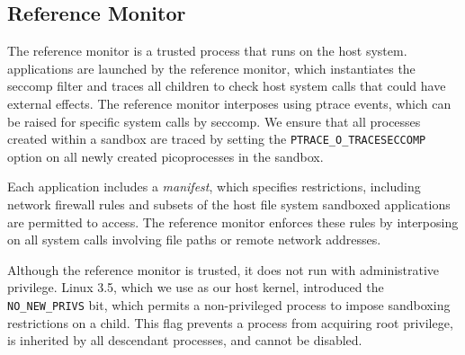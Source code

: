 \subsection{Reference Monitor}
\label{sec:graphene:security:monitor}

The reference monitor is a trusted process that runs on the host system.
\sysname{} applications are launched by the reference monitor,
which instantiates the seccomp filter and traces all children
to check host system calls that could have external effects.
The reference monitor interposes using ptrace events, 
which can be raised for specific system calls by seccomp.
We ensure that all processes created within a sandbox are traced
by setting the {\tt PTRACE\_O\_TRACESECCOMP} option on all newly created picoprocesses
in the sandbox.


Each application includes a {\em manifest}, which specifies restrictions,
including network firewall rules and subsets of the host file system sandboxed
applications are permitted to access.  The reference monitor enforces these
rules by interposing on all system calls involving file paths or remote network addresses.

\vspace{5pt}
Although the reference monitor is trusted, it does not run 
with administrative privilege.
Linux 3.5, which we use as our host kernel, 
introduced the {\tt NO\_NEW\_PRIVS} bit, which permits
a non-privileged process to impose sandboxing restrictions on a child.
This flag prevents a process from acquiring root privilege, %
is inherited by all descendant processes,
and cannot be disabled.

